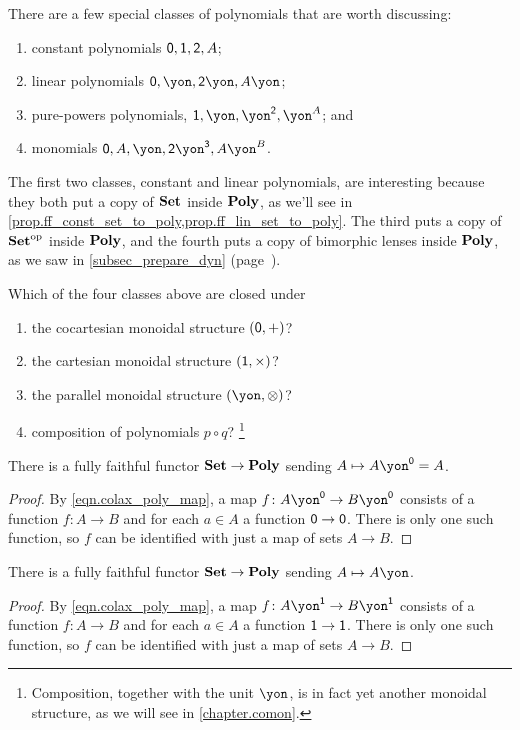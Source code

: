\documentclass[Book-Poly]{subfiles}
\begin{document}
There are a few special classes of polynomials that are worth discussing: 
\begin{enumerate}
	\item constant polynomials $\textsf{0},\textsf{1},\textsf{2},A$; 
	\item linear polynomials $\0,\yon, \2\yon, A\yon$;
	\item pure-powers polynomials, $\1, \yon, \yon^\2, \yon^A$; and 
	\item monomials $\0, A, \yon, \2\yon^\3, A\yon^B$.
\end{enumerate}
The first two classes, constant and linear polynomials, are interesting because they both put a copy of $\mathbf{Set}$ inside $\mathbf{Poly}$, as we'll see in \cref{prop.ff_const_set_to_poly,prop.ff_lin_set_to_poly}. The third puts a copy of $\mathbf{Set}^{\textnormal{op}}$ inside $\mathbf{Poly}$, and the fourth puts a copy of bimorphic lenses inside $\mathbf{Poly}$, as we saw in \cref{subsec_prepare_dyn} (page~\pageref{page.bimorphic_lens}).

\begin{exercise}
Which of the four classes above are closed under
\begin{enumerate}
	\item the cocartesian monoidal structure $(\textsf{0},+)$?
	\item the cartesian monoidal structure $(\textsf{1},\times)$?
	\item the parallel monoidal structure $(\yon,\otimes)$?
	\item composition of polynomials $p\circ q$?%
	\footnote{Composition, together with the unit $\yon$, is in fact yet another monoidal structure, as we will see in \cref{chapter.comon}.}
\qedhere
\end{enumerate}
\end{exercise}

\begin{proposition}\label{prop.ff_const_set_to_poly}
There is a fully faithful functor $\mathbf{Set}\to\mathbf{Poly}$ sending $A\mapsto A\yon^\0=A$.
\end{proposition}
\begin{proof}
By \eqref{eqn.colax_poly_map}, a map $f\colon A\yon^\0\to B\yon^\0$ consists of a function $f\colon A\to B$ and for each $a\in A$ a function $\textsf{0}\to\textsf{0}$. There is only one such function, so $f$ can be identified with just a map of sets $A\to B$.
\end{proof}

\begin{proposition}\label{prop.ff_lin_set_to_poly}
There is a fully faithful functor $\mathbf{Set}\to\mathbf{Poly}$ sending $A\mapsto A\yon$.
\end{proposition}
\begin{proof}
By \eqref{eqn.colax_poly_map}, a map $f\colon A\yon^\1\to B\yon^\1$ consists of a function $f\colon A\to B$ and for each $a\in A$ a function $\textsf{1}\to\textsf{1}$. There is only one such function, so $f$ can be identified with just a map of sets $A\to B$.
\end{proof}
\end{document}
